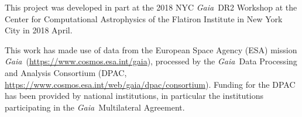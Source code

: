 \documentclass[twocolumn]{aastex62}
\newcommand{\acronym}[1]{{\small{#1}}}
\newcommand{\gaia}{\textsl{Gaia}}
\begin{document}
This project was developed in part at the 2018 \acronym{NYC} \gaia\ \acronym{DR2} Workshop at the Center for Computational Astrophysics of the Flatiron Institute in New York City in 2018 April.

This work has made use of data from the European Space Agency (\acronym{ESA}) mission \gaia\ (\url{https://www.cosmos.esa.int/gaia}), processed by the \gaia\ Data Processing and Analysis Consortium (\acronym{DPAC}, \url{https://www.cosmos.esa.int/web/gaia/dpac/consortium}). Funding for the \acronym{DPAC} has been provided by national institutions, in particular the institutions participating in the \gaia\ Multilateral Agreement.

%
%
\end{document}
